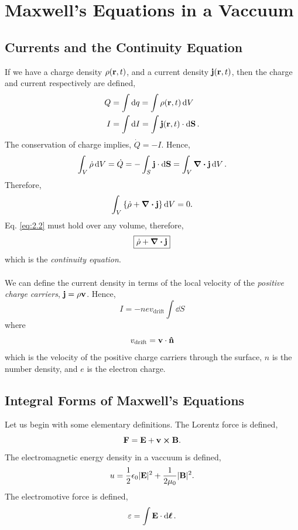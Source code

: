 \documentclass{book}
\begin{document}
\chapter{Maxwell's Equations in a Vaccuum}
\section{Currents and the Continuity Equation}
If we have a charge density $\rho(\vb{r},t)$, and a current density $\vb{j}(\vb{r},t)$, then the charge and current respectively are defined,
\begin{align}
	Q &= \int \dd{q} = \int\rho(\vb{r},t)\dd{V} \\
	I &= \int \dd{I} = \int \vb{j}(\vb{r},t)\cdot \dd{\vb{S}}.
\end{align}
The conservation of charge implies, $\Dot{Q} = -I$. Hence,
\begin{equation}
	\int_V \Dot{\rho} \dd{V} = \Dot{Q} = - \int_S\vb{j}\cdot\dd{\vb{S}} = \int_V\div{\vb{j}}\dd{V}.
\end{equation}
Therefore,
\begin{equation}
	\int_V\left\{\Dot{\rho} + \div{\vb{j}}\right\}\dd{V} = 0. \label{eq:2.2}
\end{equation}
Eq. \eqref{eq:2.2} must hold over any volume, therefore,
\begin{equation}
	\boxed{\Dot{\rho} + \div{\vb{j}}}
\end{equation}
which is the \textit{continuity equation}.
\\\\
We can define the current density in terms of the local velocity of the \textit{positive charge carriers}, $\vb{j} = \rho\vb{v}$. Hence,
\begin{equation}
	I = -nev_{\text{drift}} \int\dd{S}
\end{equation}
where
\begin{equation}
	v_{\text{drift}} = \vb{v}\cdot\vu{n}
\end{equation}
which is the velocity of the positive charge carriers through the surface, $n$ is the number density, and $e$ is the electron charge.
\section{Integral Forms of Maxwell's Equations}
Let us begin with some elementary definitions. The Lorentz force is defined,
\begin{equation}
	\vb{F} = 	\vb{E} + \vb{v}\cross\vb{B}.
\end{equation}
The electromagnetic energy density in a vaccuum is defined,
\begin{equation}
	u = \frac{1}{2}\epsilon_{0} |\vb{E}|^2 + \frac{1}{2\mu_0}|\vb{B}|^2.
\end{equation}
The electromotive force is defined,
\begin{equation}
	\varepsilon = \int \vb{E}\cdot \dd{\vb*{\ell}}.
\end{equation}
\end{document}
